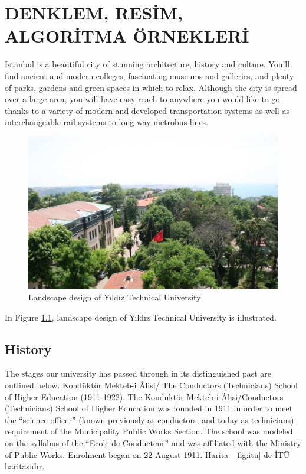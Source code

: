 \chapter{DENKLEM, RESİM, ALGORİTMA ÖRNEKLERİ}
Istanbul is a beautiful city of stunning architecture, history and culture. You'll find ancient and modern colleges, fascinating museums and galleries, and plenty of parks, gardens and green spaces in which to relax. Although the city is spread over a large area, you will have easy reach to anywhere you would like to go thanks to a variety of modern and developed transportation systems as well as interchangeable rail systems to long-way metrobus lines.

\begin{figure}[!htbp]
\centering
\includegraphics[width=\textwidth]{thesisChapters/images/Picture1.png}
\caption{Landscape design of Yıldız Technical University}
\label{fig:landscape}
\end{figure}

In Figure \ref{fig:landscape}, landscape design of Yıldız Technical University is illustrated.

\section{History}
The stages our university has passed through in its distinguished past are outlined below. Kondüktör Mekteb-i Âlisi/ The Conductors (Technicians) School of Higher Education (1911-1922). The Kondüktör Mekteb-i Âlisi/Conductors (Technicians) School of Higher Education was founded in 1911 in order to meet the “science officer” (known previously as conductors, and today as technicians) requirement of the Municipality Public Works Section. The school was modeled on the syllabus of the “Ecole de Conducteur” and was affiliated with the Ministry of Public Works. Enrolment began on 22 August 1911. Harita ~\ref{fig:itu} de İTÜ haritasıdır.


